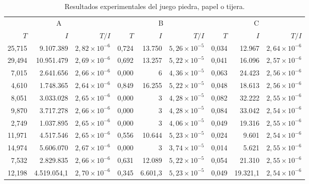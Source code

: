 \begin{table}[h]
    \centering
    \caption{Resultados experimentales del juego piedra, papel o tijera.}
    \label{tab:resultados-RPS}
    \scriptsize
    \begin{tabular}{r r r r r r r r r}
    \toprule
    \multicolumn{3}{c}{A} & \multicolumn{3}{c}{B} & \multicolumn{3}{c}{C} \\ \cmidrule(r){1-3} \cmidrule(lr){4-6} \cmidrule(l){7-9}
    $T$ & $I$ & $T/I$ & $T$ & $I$ & $T/I$ & $T$ & $I$ & $T/I$ \\ \cmidrule(r){1-3} \cmidrule(lr){4-6} \cmidrule(l){7-9}
    25,715 &  9.107.389   & $2,82 {\times} 10^{-6}$ & 0,724 & 13.750   & $5,26 {\times} 10^{-5}$ & 0,034 & 12.967   & $2,64 {\times} 10^{-6}$ \\
    29,494 & 10.951.479   & $2,69 {\times} 10^{-6}$ & 0,692 & 13.257   & $5,22 {\times} 10^{-5}$ & 0,041 & 16.096   & $2,57 {\times} 10^{-6}$ \\
     7,015 &  2.641.656   & $2,66 {\times} 10^{-6}$ & 0,000 & 6        & $4,36 {\times} 10^{-5}$ & 0,063 & 24.423   & $2,56 {\times} 10^{-6}$ \\
     4,610 &  1.748.365   & $2,64 {\times} 10^{-6}$ & 0,849 & 16.255   & $5,22 {\times} 10^{-5}$ & 0,048 & 18.613   & $2,56 {\times} 10^{-6}$ \\
     8,051 &  3.033.028   & $2,65 {\times} 10^{-6}$ & 0,000 & 3        & $4,28 {\times} 10^{-5}$ & 0,082 & 32.222   & $2,55 {\times} 10^{-6}$ \\
     9,870 &  3.717.278   & $2,66 {\times} 10^{-6}$ & 0,000 & 3        & $4,28 {\times} 10^{-5}$ & 0,084 & 33.042   & $2,54 {\times} 10^{-6}$ \\
     2,749 &  1.037.895   & $2,65 {\times} 10^{-6}$ & 0,000 & 3        & $4,06 {\times} 10^{-5}$ & 0,049 & 19.316   & $2,55 {\times} 10^{-6}$ \\
    11,971 &  4.517.546   & $2,65 {\times} 10^{-6}$ & 0,556 & 10.644   & $5,23 {\times} 10^{-5}$ & 0,024 &  9.601   & $2,54 {\times} 10^{-6}$ \\
    14,974 &  5.606.070   & $2,67 {\times} 10^{-6}$ & 0,000 & 3        & $3,74 {\times} 10^{-5}$ & 0,014 &  5.621   & $2,55 {\times} 10^{-6}$ \\
     7,532 &  2.829.835   & $2,66 {\times} 10^{-6}$ & 0,631 & 12.089   & $5,22 {\times} 10^{-5}$ & 0,054 & 21.310   & $2,55 {\times} 10^{-6}$ \\ \cmidrule(r){1-3} \cmidrule(lr){4-6} \cmidrule(l){7-9}
    12,198 &  4.519.054,1 & $2,70 {\times} 10^{-6}$ & 0,345 &  6.601,3 & $5,23 {\times} 10^{-5}$ & 0,049 & 19.321,1 & $2,54 {\times} 10^{-6}$ \\ \bottomrule
    \end{tabular}
\end{table}

